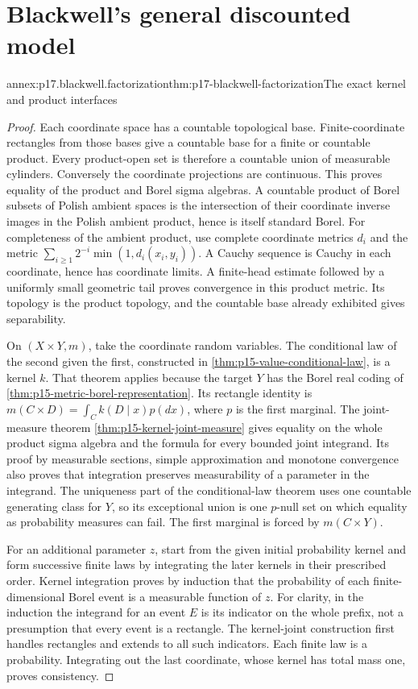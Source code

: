 \section{Blackwell's general discounted model}
\label{sec:annex-p17-blackwell-general-discounted}

\begin{annexitem}{annex:p17.blackwell.factorization}{thm:p17-blackwell-factorization}{The exact kernel and product interfaces}
\begin{proof}
Each coordinate space has a countable topological base.
Finite-coordinate rectangles from those bases give a countable
base for a finite or countable product. Every product-open
set is therefore a countable union of measurable cylinders.
Conversely the coordinate projections are continuous.
This proves equality of the product and Borel sigma algebras.
A countable product of Borel subsets of Polish ambient spaces
is the intersection of their coordinate inverse images in
the Polish ambient product, hence is itself standard Borel.
For completeness of the ambient product, use complete coordinate
metrics \(d_i\) and the metric
\(\sum_{i\geq1}2^{-i}\min(1,d_i(x_i,y_i))\).
A Cauchy sequence is Cauchy in each coordinate, hence has
coordinate limits. A finite-head estimate followed by a
uniformly small geometric tail proves convergence in this
product metric. Its topology is the product topology, and the
countable base already exhibited gives separability.

On \((X\times Y,m)\), take the coordinate random variables.
The conditional law of the second given the first, constructed in
\cref{thm:p15-value-conditional-law}, is a kernel \(k\).
That theorem applies because the target \(Y\) has the Borel real
coding of \cref{thm:p15-metric-borel-representation}.
Its rectangle identity is
\(m(C\times D)=\int_C k(D\mid x)p(dx)\), where \(p\) is
the first marginal. The joint-measure theorem
\cref{thm:p15-kernel-joint-measure} gives equality on the whole
product sigma algebra and the formula for every bounded joint
integrand. Its proof by measurable sections, simple approximation
and monotone convergence also proves that integration preserves
measurability of a parameter in the integrand. The uniqueness
part of the conditional-law theorem uses one countable generating
class for \(Y\), so its exceptional union is one \(p\)-null set
on which equality as probability measures can fail.
The first marginal is forced by \(m(C\times Y)\).

For an additional parameter \(z\), start from the given initial
probability kernel and form successive finite laws by integrating
the later kernels in their prescribed order. Kernel
integration proves by induction that the probability of each
finite-dimensional Borel event is a measurable function of \(z\).
For clarity, in the induction the integrand for an event \(E\)
is its indicator on the whole prefix, not a presumption that
every event is a rectangle. The kernel-joint construction first
handles rectangles and extends to all such indicators.
Each finite law is a probability. Integrating out the last
coordinate, whose kernel has total mass one, proves consistency.


\end{proof}
\end{annexitem}
